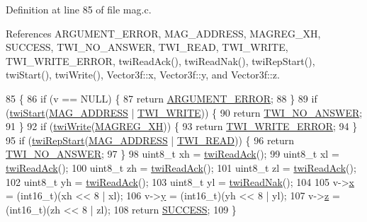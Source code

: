 Definition at line 85 of file mag.\-c.



References A\-R\-G\-U\-M\-E\-N\-T\-\_\-\-E\-R\-R\-O\-R, M\-A\-G\-\_\-\-A\-D\-D\-R\-E\-S\-S, M\-A\-G\-R\-E\-G\-\_\-\-X\-H, S\-U\-C\-C\-E\-S\-S, T\-W\-I\-\_\-\-N\-O\-\_\-\-A\-N\-S\-W\-E\-R, T\-W\-I\-\_\-\-R\-E\-A\-D, T\-W\-I\-\_\-\-W\-R\-I\-T\-E, T\-W\-I\-\_\-\-W\-R\-I\-T\-E\-\_\-\-E\-R\-R\-O\-R, twi\-Read\-Ack(), twi\-Read\-Nak(), twi\-Rep\-Start(), twi\-Start(), twi\-Write(), Vector3f\-::x, Vector3f\-::y, and Vector3f\-::z.


\begin{DoxyCode}
85                            \{
86     \textcolor{keywordflow}{if} (v == NULL) \{
87         \textcolor{keywordflow}{return} \hyperlink{group__error_gga2c3e4bb40f36b262a5214e2da2bca9c5a49ccf277a69dd938c591928aa27c66cc}{ARGUMENT\_ERROR};
88     \}
89     \textcolor{keywordflow}{if} (\hyperlink{group__twi_ga4f86edc73f37ce976ea2225519ab31cd}{twiStart}(\hyperlink{group__config_gade4e63fac819c67040e374f08d2d7230}{MAG\_ADDRESS} | \hyperlink{group__twi_ga3b68e8e777b71520f9dbfac733774d5f}{TWI\_WRITE})) \{
90         \textcolor{keywordflow}{return} \hyperlink{group__error_gga2c3e4bb40f36b262a5214e2da2bca9c5a04d5943ba652af2205c88b247e0c659c}{TWI\_NO\_ANSWER};
91     \}
92     \textcolor{keywordflow}{if} (\hyperlink{group__twi_gaf42e50aaf4a9794d3a2c000e7b407887}{twiWrite}(\hyperlink{group__mag_ga84e94fce89f9ba26ff3f33621c3a63bd}{MAGREG\_XH})) \{
93         \textcolor{keywordflow}{return} \hyperlink{group__error_gga2c3e4bb40f36b262a5214e2da2bca9c5ac0e3b3463dcaf220e54794b4711708c9}{TWI\_WRITE\_ERROR};
94     \}
95     \textcolor{keywordflow}{if} (\hyperlink{group__twi_ga996e3cbbbb7239e2278bd286e61f0791}{twiRepStart}(\hyperlink{group__config_gade4e63fac819c67040e374f08d2d7230}{MAG\_ADDRESS} | \hyperlink{group__twi_gaaf9a8abccd811954f9cc316f2b2f87b3}{TWI\_READ})) \{
96         \textcolor{keywordflow}{return} \hyperlink{group__error_gga2c3e4bb40f36b262a5214e2da2bca9c5a04d5943ba652af2205c88b247e0c659c}{TWI\_NO\_ANSWER};
97     \}
98     uint8\_t xh = \hyperlink{group__twi_ga0ab816bd0abcc24d6817f8395de7eafd}{twiReadAck}();
99     uint8\_t xl = \hyperlink{group__twi_ga0ab816bd0abcc24d6817f8395de7eafd}{twiReadAck}();
100     uint8\_t zh = \hyperlink{group__twi_ga0ab816bd0abcc24d6817f8395de7eafd}{twiReadAck}();
101     uint8\_t zl = \hyperlink{group__twi_ga0ab816bd0abcc24d6817f8395de7eafd}{twiReadAck}();
102     uint8\_t yh = \hyperlink{group__twi_ga0ab816bd0abcc24d6817f8395de7eafd}{twiReadAck}();
103     uint8\_t yl = \hyperlink{group__twi_ga5fad19b3784aeaa9ae995e64f9e965b8}{twiReadNak}();
104 
105     v->\hyperlink{struct_vector3f_af88b946fb90d5f08b5fb740c70e98c10}{x} = (int16\_t)(xh << 8 | xl);
106     v->\hyperlink{struct_vector3f_ab927965981178aa1fba979a37168db2a}{y} = (int16\_t)(yh << 8 | yl);
107     v->\hyperlink{struct_vector3f_ab3e6ed577a7c669c19de1f9c1b46c872}{z} = (int16\_t)(zh << 8 | zl);
108     \textcolor{keywordflow}{return} \hyperlink{group__error_gga2c3e4bb40f36b262a5214e2da2bca9c5ac7f69f7c9e5aea9b8f54cf02870e2bf8}{SUCCESS};
109 \}
\end{DoxyCode}
